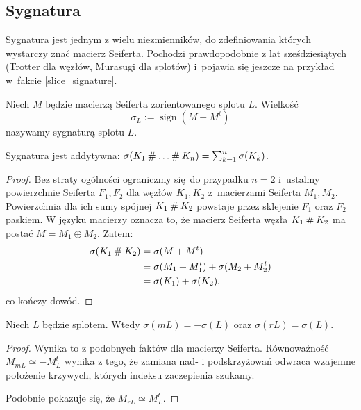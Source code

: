 \subsection{Sygnatura}
\label{sub:signature}
Sygnatura jest jednym z wielu niezmienników, do zdefiniowania których wystarczy znać macierz Seiferta.
Pochodzi prawdopodobnie z lat sześdziesiątych (Trotter \cite{trotter62} dla węzłów, Murasugi \cite{murasugi65} dla splotów) i~pojawia się jeszcze na przykład w~fakcie \ref{slice_signature}.

\begin{definition}[sygnatura]
    Niech $M$ będzie macierzą Seiferta zorientowanego splotu $L$.
    Wielkość
    \begin{equation}
        \sigma_L := \operatorname{sign} (M + M^t)
    \end{equation}
    nazywamy sygnaturą splotu $L$.
\end{definition}

\begin{proposition} \label{prop_sigma_additive}
    Sygnatura jest addytywna: $\sigma(K_1 \mathbin{\#} \ldots \mathbin{\#} K_n) = \sum_{k=1}^n \sigma(K_k)$.
\end{proposition}

\begin{proof}
    Bez straty ogólności ograniczmy się do przypadku $n = 2$ i~ustalmy powierzchnie Seiferta $F_1, F_2$ dla węzłów $K_1, K_2$ z~macierzami Seiferta $M_1, M_2$.
    Powierzchnia dla ich sumy spójnej $K_1 \mathbin{\#} K_2$ powstaje przez sklejenie $F_1$ oraz $F_2$ paskiem.
    W języku macierzy oznacza to, że macierz Seiferta węzła $K_1 \mathbin{\#} K_2$ ma postać $M = M_1 \oplus M_2$.
    Zatem:
    \begin{align}
        \sigma(K_1 \mathbin{\#} K_2) & = \sigma(M + M^t) \\
                               & = \sigma(M_1 + M_1^t) + \sigma(M_2 + M_2^t) \\
                               & = \sigma(K_1) + \sigma(K_2),
    \end{align}
    co kończy dowód.
\end{proof}

\begin{proposition} \label{prop_sigma_inverse}
    Niech $L$ będzie splotem.
    Wtedy $\sigma(mL) = -\sigma(L)$ oraz $\sigma(rL) = \sigma(L)$.
\end{proposition}

\begin{proof}
    Wynika to z podobnych faktów dla macierzy Seiferta.
    Równoważność $M_{mL} \simeq - M_L^t$ wynika z tego, że zamiana nad- i podskrzyżowań odwraca wzajemne położenie krzywych, których indeksu zaczepienia szukamy.

    Podobnie pokazuje się, że $M_{rL} \simeq M_L^t$.
\end{proof}

